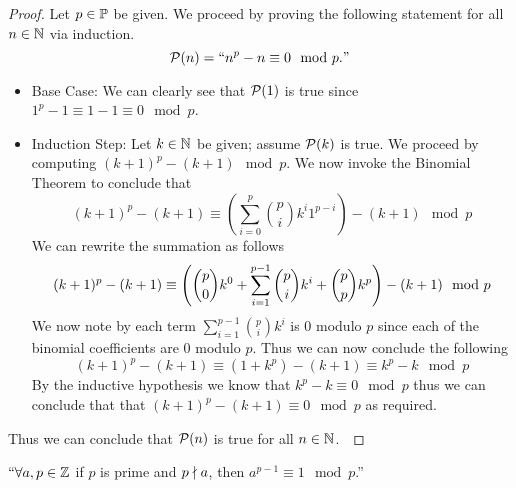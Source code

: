         \begin{proof}
            Let $p \in \mathbb{P}$ be given. We proceed by proving the following statement
            for all $n \in \mathbb{N}$ via induction.
            \[
                \mathcal{P}(n) = ``n^p - n \equiv 0 \mod p."
            \]
            \begin{itemize}
                \item
                    Base Case: We can clearly see that $\mathcal{P}(1)$ is true since
                    $1^p - 1 \equiv 1 - 1 \equiv 0 \mod p$.
                \item
                    Induction Step: Let $k \in \mathbb{N}$ be given; assume $\mathcal{P}(k)$
                    is true. We proceed by computing $(k + 1)^p - (k + 1) \mod p$. We now invoke
                    the Binomial Theorem to conclude that
                    \[
                        (k + 1)^p - (k + 1) \equiv \left(\sum_{i = 0}^p \binom{p}{i} k^i 1^{p - i}\right) - (k + 1) \mod p
                    \]
                    We can rewrite the summation as follows
                    \[
                       (k + 1)^p - (k + 1) \equiv \left(\dbinom{p}{0} k^0 + \sum_{i = 1}^{p - 1} \dbinom{p}{i}k^i + \dbinom{p}{p}k^p\right) - (k + 1) \mod p
                    \]
                    We now note by  each term $\sum_{i = 1}^{p - 1} \binom{p}{i}k^i$ 
                    is 0 modulo $p$ since each of the binomial coefficients are 0 modulo $p$. Thus
                    we can now conclude the following
                    \[
                       (k + 1)^p - (k + 1) \equiv (1 + k^p) - (k + 1) \equiv k^p - k \mod p
                    \]
                    By the inductive hypothesis we know that $k^p - k \equiv 0 \mod p$
                    thus we can conclude that that $(k + 1)^p - (k + 1) \equiv 0 \mod p$
                    as required.
            \end{itemize}
            Thus we can conclude that $\mathcal{P}(n)$ is true for all $n \in \mathbb{N}$.~\QED
        \end{proof}
        \begin{theorem}
            $``\forall a, p \in \mathbb{Z}$ if $p$ is prime and $p \nmid a$, then
            $a^{p - 1} \equiv 1 \mod p$.''
            \label{Fermat's Little Theorem}
        \end{theorem}
